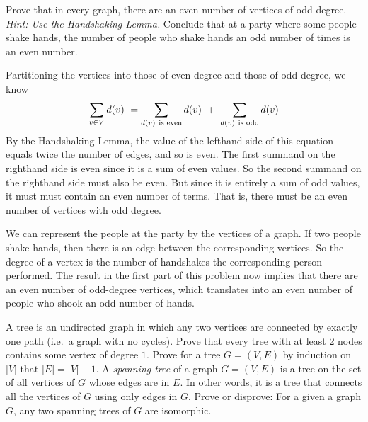 \documentclass[solution, letterpaper]{cs20}
\begin{document}


\subproblem Prove that in every graph, there are an even number of vertices of odd degree. \emph{Hint: Use the Handshaking Lemma.}
\subproblem Conclude that at a party where some people shake
hands, the number of people who shake hands an odd number of times is an
even number.

\begin{solution} 
\subsolution Partitioning the vertices into those of even degree and those of odd degree, we know
\[
{\sum_{v \in V} d(v)}\ =
\sum_{d(v) \mbox{ {\scriptsize is even}}} d(v)\ +\
\sum_{d(v) \mbox{ {\scriptsize is odd}}} d(v)
\]
By the Handshaking Lemma, the value of the lefthand side of this
equation equals twice the number of edges, and so is even.  The first
summand on the righthand side is even since it is a sum of even
values.  So the second summand on the righthand side must also be even.
But since it is entirely a sum of odd values, it must must contain an even
number of terms.  That is, there must be an even number of vertices with
odd degree.

\subsolution We can represent the people at the party by the vertices of a
graph.  If two people shake hands, then there is an edge between the
corresponding vertices.  So the degree of a vertex is the number of
handshakes the corresponding person performed.  The result in the first
part of this problem now implies that there are an even number of
odd-degree vertices, which translates into an even number of people who
shook an odd number of hands.
\end{solution}

A tree is an undirected graph in which any two vertices are connected by exactly one path (i.e.~a graph with no cycles).  
\subproblem Prove that every tree with at least 2 nodes contains some vertex of degree $1$.
\subproblem Prove for a tree $G=(V,E)$ by induction on $|V|$ that $|E|=|V|-1$.
\subproblem A \emph{spanning tree} of a graph $G=(V,E)$ is a tree on the set of all vertices of $G$ whose edges are in $E$. In other words, it is a tree that connects all the vertices of $G$ using only edges in $G$.  Prove or disprove: For a given a graph $G$, any two spanning trees of $G$ are isomorphic.
\end{document}
